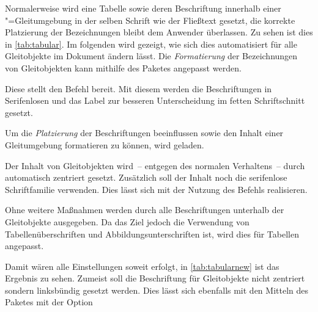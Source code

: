 \documentclass[%
  english,ngerman,%
  geometry=no,DIV=12,automark,%
]{tudscrartcl}
\begin{document}
Normalerweise wird eine Tabelle sowie deren Beschriftung innerhalb einer 
"=Gleitumgebung in der selben Schrift wie der Fließtext 
gesetzt, die korrekte Platzierung der Bezeichnungen bleibt dem Anwender 
überlassen. Zu sehen ist dies in \autoref{tab:tabular}. Im folgenden wird 
gezeigt, wie sich dies automatisiert für alle Gleitobjekte im Dokument ändern 
lässt. Die \emph{Formatierung} der Bezeichnungen von Gleitobjekten kann 
mithilfe des Paketes  angepasst werden.
%
\begin{Preamble}
\usepackage{caption}
\end{Preamble}
%
Diese stellt den Befehl  bereit. Mit diesem werden die 
Beschriftungen in Serifenlosen und das Label zur besseren Unterscheidung im 
fetten Schriftschnitt gesetzt.
%
\begin{Preamble*}
\captionsetup{font=sf,labelfont=bf,labelsep=space}
\end{Preamble*}
%
Um die \emph{Platzierung} der Beschriftungen beeinflussen sowie den Inhalt 
einer Gleitumgebung formatieren zu können, wird  geladen.
\begin{Preamble}
\usepackage{floatrow}
\end{Preamble}
%
Der Inhalt von Gleitobjekten wird~-- entgegen des normalen Verhaltens~-- durch 
 automatisch zentriert gesetzt. Zusätzlich soll der Inhalt 
noch die serifenlose Schriftfamilie verwenden. Dies lässt sich mit der Nutzung 
des Befehls  realisieren.
%
\begin{Preamble*}
\end{Preamble*}
%
Ohne weitere Maßnahmen werden durch  alle Beschriftungen 
unterhalb der Gleitobjekte ausgegeben. Da das Ziel jedoch die Verwendung von 
Tabellenüberschriften und Abbildungsunterschriften ist, wird dies für Tabellen
angepasst.
%
\begin{Preamble*}
\end{Preamble*}
%
\begin{table}
\end{table}
%
Damit wären alle Einstellungen soweit erfolgt, in \autoref{tab:tabularnew} ist 
das Ergebnis zu sehen. Zumeist soll die Beschriftung für Gleitobjekte nicht 
zentriert sondern linksbündig gesetzt werden. Dies lässt sich ebenfalls mit den 
Mitteln des Paketes  mit der Option  
\end{document}
